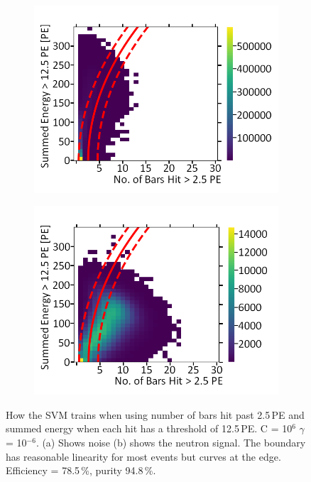 \begin{figure}[!h]
\centering
\begin{subfigure}{.5\textwidth}
  \centering
  \includegraphics[width=\linewidth]{Appendix1/Figs/Bars1Sum2Noise.png}
  \captionsetup{width=.9\linewidth}
  \caption{}
  \label{subFig:Bars1Sum2N}
\end{subfigure}%
\begin{subfigure}{.5\textwidth}
  \centering
\includegraphics[width=\linewidth]{Appendix1/Figs/Bars1Sum2Signal.png}
  \captionsetup{width=.9\linewidth}
  \caption{}
  \label{subFig:Bars1Sum2S}
\end{subfigure}
\caption[LIBLINEAR SVM Nyström approximated RBF kernel for number of bars hit > 2.5\,PE vs summed energy > 12.5\,PE.]{How the SVM trains when using number of bars hit past 2.5\,PE and summed energy when each hit has a threshold of 12.5\,PE. C = 10$^6$ $\gamma$ = 10$^{-6}$. (a) Shows noise (b) shows the neutron signal. The boundary has reasonable linearity for most events but curves at the edge. Efficiency = 78.5\,\%, purity 94.8\,\%.}
\label{fig:Bars1Sum2SN}
\end{figure}

